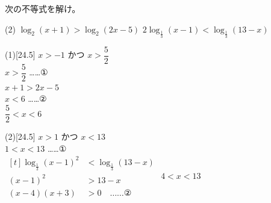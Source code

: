 \documentclass[14pt,dvipdfmx]{jsarticle}
\begin{document}
\vfill
\nextpage

\quad
次の不等式を解け。
\par\vspace{-0.22em}
\begin{tasks}[label=(\arabic*), label-width=1.6zw, item-indent=2zw, after-item-skip=0.04em](2)
  \task $\log_{2}(x+1)>\log_{2}(2x-5)$
  \task $2\log_{\frac{1}{3}}(x-1)<\log_{\frac{1}{3}}(13-x)$
\end{tasks}
\vspace{0.04em}
\begin{answerbox}{(1)}[24.5]
  $x>-1$ かつ $x>\dfrac{5}{2}$ \\
  $x>\dfrac{5}{2}$ \quad ……①\\
  $x+1>2x-5$ \\
  \makebox[15zw][l]{} $x<6$ \quad ……②\\
   $\dfrac{5}{2}<x<6$
\end{answerbox}
\vspace{0.12em}
\begin{answerbox}{(2)}[24.5]
  $x>1$ かつ $x<13$ \\
  $1<x<13$ \quad ……①\\
  $\begin{aligned}[t]
    \log_{\frac{1}{3}}(x-1)^{2} &< \log_{\frac{1}{3}}(13-x) \\
    (x-1)^{2} &> 13-x \\
    (x-4)(x+3) &> 0 \quad \text{……②}
  \end{aligned}$
   $4<x<13$
\end{answerbox}

\vfill
\end{document}
